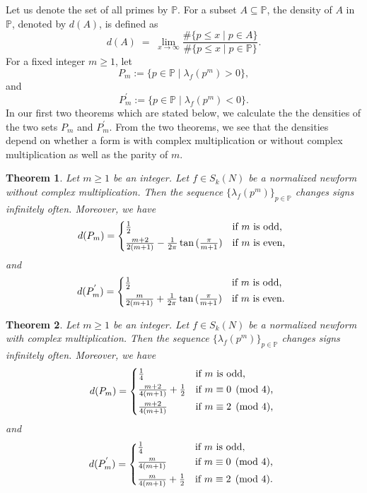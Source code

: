 \documentclass[12pt,a4paper,reqno]{amsart}
\newtheorem{theorem}{Theorem}[section]
\begin{document}
Let us denote the set of all primes by $\mathbb{P}$. For a subset $A \subseteq \mathbb{P}$, the density of $A$
in $\mathbb{P}$, denoted by $d(A)$, is defined as
\begin{equation}
d(A)\;=\; \lim_{x\to \infty}\frac{\#\{p\leq x\mid p\in A\}}{\#\{p\leq x \mid p \in \mathbb{P}\}}.
\end{equation} 
For a fixed integer $m\geq 1$, let 
$$
P_m :=\{p \in \mathbb{P} \mid \lambda_f(p^m)>0\},
$$
and 
$$
P^{'}_{m} :=\{p \in \mathbb{P} \mid \lambda_f(p^m)<0\}.
$$
In our first two theorems which are stated below, we calculate the the densities of the two sets $P_m$ and $P^{'}_{m}$. From the two theorems, we see that the densities depend on whether a form is with complex multiplication or without complex multiplication as well as the parity of $m$.
\begin{theorem}\label{thm:noncm}
Let $m\geq 1$ be an integer.
Let $f\in S_k(N)$ be a normalized newform without complex multiplication. 
Then the sequence $\{\lambda_f(p^m)\}_{p \in \mathbb{P}}$ changes signs infinitely often.
Moreover, we have 
\begin{equation}
    d(P_m)=
    \begin{cases*}
      \frac{1}{2} & \rm{if} $m$ is odd, \\
      \frac{m+2}{2(m+1)} -\frac{1}{2\pi}\tan{(\frac{\pi}{m+1})} & \rm{if} $m$ is even,
    \end{cases*}
  \end{equation}
  and
  \begin{equation}
    d(P^{'}_{m})=
    \begin{cases*}
      \frac{1}{2} & \rm if $m$ is odd,\\
      \frac{m}{2(m+1)} +\frac{1}{2\pi}\tan{(\frac{\pi}{m+1})} & \rm if $m$ is even.
    \end{cases*}
  \end{equation}
\end{theorem}
\begin{theorem}\label{thm:cm}
Let $m\geq 1$ be an integer.
Let $f\in S_k(N)$ be a normalized newform with complex multiplication. Then 
the sequence $\{\lambda_f(p^m)\}_{p \in \mathbb{P}}$ changes signs infinitely often.
Moreover, we have  
\begin{equation}
    d(P_m)=
    \begin{cases*}
      \frac{1}{4} & \rm if $m$ is odd, \\
      \frac{m+2}{4(m+1)}+\frac{1}{2}    & \rm if $m\equiv0\pmod 4$, \\
      \frac{m+2}{4(m+1)} & \rm if $m\equiv 2\pmod 4$,
    \end{cases*}
  \end{equation}
  and 
  \begin{equation}
    d(P^{'}_m)=
    \begin{cases*}
      \frac{1}{4} & \rm if $m$ is odd, \\
      \frac{m}{4(m+1)} & \rm if $m\equiv 0\pmod 4$,\\
      \frac{m}{4(m+1)} +\frac{1}{2}   & \rm if $m\equiv 2\pmod 4$.
    \end{cases*}
  \end{equation}
\end{theorem}
\end{document}
